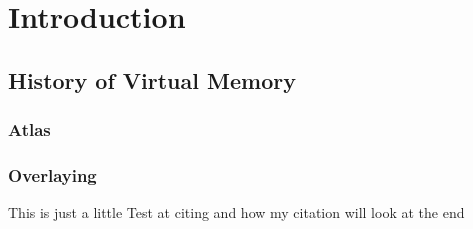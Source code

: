 \chapter{Introduction} %

\label{Intro}


\section{History of Virtual Memory}
\subsection{Atlas}
\subsection{Overlaying}


This is just a little Test at citing and how my citation will
look at the end \cite{jacobSoftwaremanagedAddressTranslation1997}

\cite{BuchananRSS08}\cite{DietrichKBF18}

